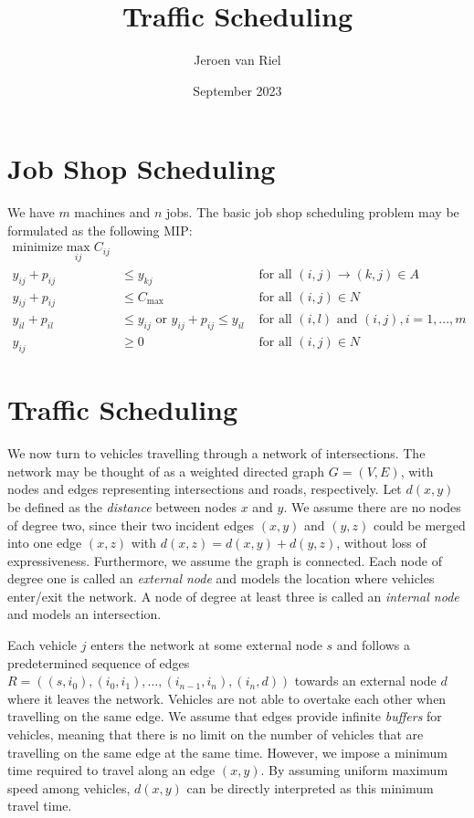 \documentclass{article}
\title{Traffic Scheduling}
\author{Jeroen van Riel}
\date{September 2023}
\begin{document}
\maketitle

\section{Job Shop Scheduling}
We have $m$ machines and $n$ jobs. The basic job shop scheduling problem may be
formulated as the following MIP:
\begin{align*}
  \text{minimize} \max_{ij} C_{ij} \\
  y_{ij} + p_{ij} &\leq y_{kj}  & \text{ for all } (i,j) \xrightarrow{} (k,j) \in A \\
  y_{ij} + p_{ij} &\leq C_{\text{max}} & \text{ for all } (i,j) \in N \\
  y_{il} + p_{il} &\leq  y_{ij} \text{ or } y_{ij} + p_{ij} \leq y_{il}  & \text{ for all } (i,l) \text{ and } (i,j), i =1, \dots,m \\
  y_{ij} &\geq 0 & \text{ for all } (i,j) \in N
\end{align*}


\section{Traffic Scheduling}

We now turn to vehicles travelling through a network of intersections. The
network may be thought of as a weighted directed graph $G=(V,E)$, with nodes and
edges representing intersections and roads, respectively. Let $d(x,y)$ be
defined as the \textit{distance} between nodes $x$ and $y$. We assume there are
no nodes of degree two, since their two incident edges $(x,y)$ and $(y,z)$ could
be merged into one edge $(x,z)$ with $d(x,z) = d(x,y) + d(y,z)$, without loss of
expressiveness. Furthermore, we assume the graph is connected. Each node of
degree one is called an \textit{external node} and models the location where
vehicles enter/exit the network. A node of degree at least three is called an
\textit{internal node} and models an intersection.

Each vehicle $j$ enters the network at some external node $s$ and follows a
predetermined sequence of edges
$R = ((s,i_{0}), (i_{0},i_{1}), \dots, (i_{n-1},i_{n}), (i_{n},d))$ towards an
external node $d$ where it leaves the network. Vehicles are not able to overtake
each other when travelling on the same edge. We assume that edges provide
infinite \textit{buffers} for vehicles, meaning that there is no limit on the
number of vehicles that are travelling on the same edge at the same time.
However, we impose a minimum time required to travel along an edge $(x,y)$. By
assuming uniform maximum speed among vehicles, $d(x,y)$ can be directly
interpreted as this minimum travel time.
\end{document}

